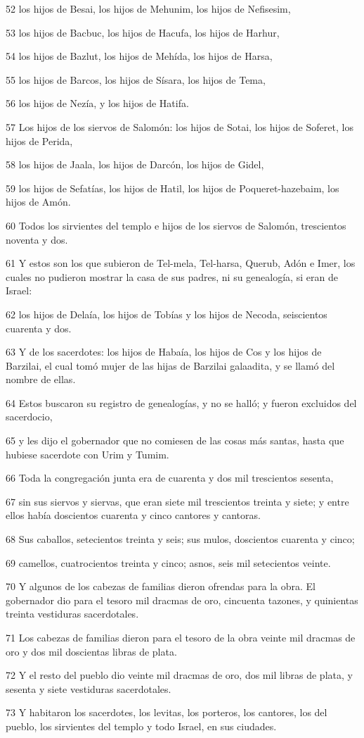 \par 52 los hijos de Besai, los hijos de Mehunim, los hijos de Nefisesim,
\par 53 los hijos de Bacbuc, los hijos de Hacufa, los hijos de Harhur,
\par 54 los hijos de Bazlut, los hijos de Mehída, los hijos de Harsa,
\par 55 los hijos de Barcos, los hijos de Sísara, los hijos de Tema,
\par 56 los hijos de Nezía, y los hijos de Hatifa.
\par 57 Los hijos de los siervos de Salomón: los hijos de Sotai, los hijos de Soferet, los hijos de Perida,
\par 58 los hijos de Jaala, los hijos de Darcón, los hijos de Gidel,
\par 59 los hijos de Sefatías, los hijos de Hatil, los hijos de Poqueret-hazebaim, los hijos de Amón.
\par 60 Todos los sirvientes del templo e hijos de los siervos de Salomón, trescientos noventa y dos.
\par 61 Y estos son los que subieron de Tel-mela, Tel-harsa, Querub, Adón e Imer, los cuales no pudieron mostrar la casa de sus padres, ni su genealogía, si eran de Israel:
\par 62 los hijos de Delaía, los hijos de Tobías y los hijos de Necoda, seiscientos cuarenta y dos.
\par 63 Y de los sacerdotes: los hijos de Habaía, los hijos de Cos y los hijos de Barzilai, el cual tomó mujer de las hijas de Barzilai galaadita, y se llamó del nombre de ellas.
\par 64 Estos buscaron su registro de genealogías, y no se halló; y fueron excluidos del sacerdocio,
\par 65 y les dijo el gobernador que no comiesen de las cosas más santas, hasta que hubiese sacerdote con Urim y Tumim. 
\par 66 Toda la congregación junta era de cuarenta y dos mil trescientos sesenta,
\par 67 sin sus siervos y siervas, que eran siete mil trescientos treinta y siete; y entre ellos había doscientos cuarenta y cinco cantores y cantoras.
\par 68 Sus caballos, setecientos treinta y seis; sus mulos, doscientos cuarenta y cinco;
\par 69 camellos, cuatrocientos treinta y cinco; asnos, seis mil setecientos veinte.
\par 70 Y algunos de los cabezas de familias dieron ofrendas para la obra. El gobernador dio para el tesoro mil dracmas de oro, cincuenta tazones, y quinientas treinta vestiduras sacerdotales.
\par 71 Los cabezas de familias dieron para el tesoro de la obra veinte mil dracmas de oro y dos mil doscientas libras de plata.
\par 72 Y el resto del pueblo dio veinte mil dracmas de oro, dos mil libras de plata, y sesenta y siete vestiduras sacerdotales.
\par 73 Y habitaron los sacerdotes, los levitas, los porteros, los cantores, los del pueblo, los sirvientes del templo y todo Israel, en sus ciudades. 


